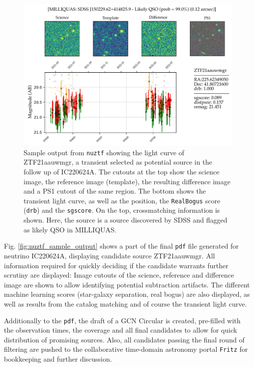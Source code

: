 \documentclass[
    a4paper, %
    fontsize=10pt, %
    twoside=true, %
    numbers=noenddot, %
    fontmethod=tex,
]{kaobook}
\begin{document}
\begin{figure}[h!]
    \includegraphics{fu/nuztf_IC220624A.pdf}
    \caption[\texttt{nuztf} output]{Sample output from \texttt{nuztf} showing the light curve of ZTF21aauwmgr, a transient selected as potential source in the follow up of IC220624A. The cutouts at the top show the science image, the reference image (template), the resulting difference image and a PS1 cutout of the same region. The bottom shows the transient light curve, as well as the position, the \texttt{RealBogus} score (\texttt{drb}) and the \texttt{sgscore}. On the top, crossmatching information is shown. Here, the source is a source discovered by SDSS and flagged as likely QSO in MILLIQUAS.}
\end{figure}
Fig. \ref{fig:nuztf_sample_output} shows a part of the final \texttt{pdf} file generated for neutrino IC220624A, displaying candidate source ZTF21aauwmgr. All information required for quickly deciding if the candidate warrants further scrutiny are displayed: Image cutouts of the science, reference and difference image are shown to allow identifying potential subtraction artifacts. The different machine learning scores (star-galaxy separation, real bogus) are also displayed, as well as results from the catalog matching and of course the transient light curve.

Additionally to the \texttt{pdf}, the draft of a GCN Circular is created, pre-filled with the observation times, the coverage and all final candidates to allow for quick distribution of promising sources. Also, all candidates passing the final round of filtering are pushed to the collaborative time-domain astronomy portal \texttt{Fritz} for bookkeeping and further discussion.
\end{document}
